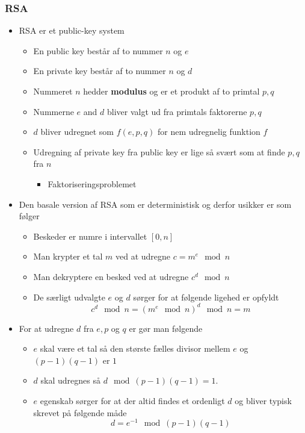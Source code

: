\documentclass[a4, english]{article}
\begin{document}
\subsubsection{RSA}
\begin{itemize}
	\item RSA er et public-key system
  \begin{itemize}
  	\item En public key består af to nummer $n$ og $e$
    \item En private key består af to nummer $n$ og $d$
    \item Nummeret $n$ hedder \textbf{modulus} og er et produkt af to primtal $p,q$ 
    \item Nummerne $e$ and $d$ bliver valgt ud fra primtals faktorerne $p,q$ 
    \item $d$ bliver udregnet som $f(e,p,q)$ for nem udregnelig funktion $f$
    \item Udregning af private key fra public key er lige så svært som at finde $p,q$ fra $n$ 
    \begin{itemize}
    	\item Faktoriseringsproblemet 
    \end{itemize}
  \end{itemize}
  \item Den basale version af RSA som er deterministisk og derfor usikker er som følger
  \begin{itemize}
  	\item Beskeder er numre i intervallet $[0, n]$ 
    \item Man krypter et tal $m$ ved at udregne $c= m^e \mod n$
    \item Man dekryptere en besked ved at udregne $c^d \mod n$ 
    \item De særligt udvalgte $e$ og $d$ sørger for at følgende ligehed er opfyldt
    \begin{equation*}
c^d \mod n = (m^e \mod n)^d \mod n = m
    \end{equation*}
  \end{itemize}   
  \item For at udregne $d$ fra $e,p$ og $q$ er gør man følgende
  \begin{itemize}
  	\item $e$ skal være et tal så den største fælles divisor mellem $e$ og $(p-1)(q-1)$ er $1$ 
    \item $d$ skal udregnes så $d \mod (p - 1)(q - 1) = 1$.
    \item $e$ egenskab sørger for at der altid findes et ordenligt $d$ og bliver typisk skrevet på følgende måde
  \begin{equation*}
  d = e^{-1} \mod (p - 1)(q - 1)
  \end{equation*}


\end{itemize}
\end{itemize}
\end{document}
